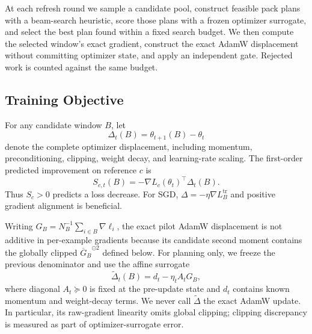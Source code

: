 \documentclass{article}
\begin{document}
At each refresh round we sample a candidate pool, construct feasible pack plans
with a beam-search heuristic, score those plans with a frozen optimizer
surrogate, and select the best plan found within a fixed search budget. We then compute the selected
window's exact gradient, construct the exact AdamW displacement without
committing optimizer state, and apply an independent gate. Rejected work is
counted against the same budget.

\subsection{Training Objective}

For any candidate window $B$, let
\begin{equation}
\Delta_t(B)=\theta_{t+1}(B)-\theta_t
\end{equation}
denote the complete optimizer displacement, including momentum,
preconditioning, clipping, weight decay, and learning-rate scaling. The
first-order predicted improvement on reference $c$ is
\begin{equation}
S_{c,t}(B)=-\nabla L_c(\theta_t)^\top\Delta_t(B).
\label{eq:exact-score}
\end{equation}
Thus $S_c>0$ predicts a loss decrease. For SGD,
$\Delta=-\eta\nabla L_B^{\mathrm{tr}}$ and positive gradient alignment is
beneficial.

Writing $G_B=N_B^{-1}\sum_{i\in B}\nabla\ell_i$, the exact pilot AdamW
displacement is not additive in per-example gradients because its candidate
second moment contains the globally clipped
${\overline G_B}^{\odot 2}$ defined below. For planning only, we freeze the
previous denominator and use the affine surrogate
\begin{equation}
\widetilde\Delta_t(B)=d_t-\eta_t A_tG_B,
\label{eq:surrogate}
\end{equation}
where diagonal $A_t\succeq0$ is fixed at the pre-update state and $d_t$
contains known momentum and weight-decay terms. We never call
$\widetilde\Delta$ the exact AdamW update. In particular, its raw-gradient
linearity omits global clipping; clipping discrepancy is measured as part of
optimizer-surrogate error.
\end{document}
